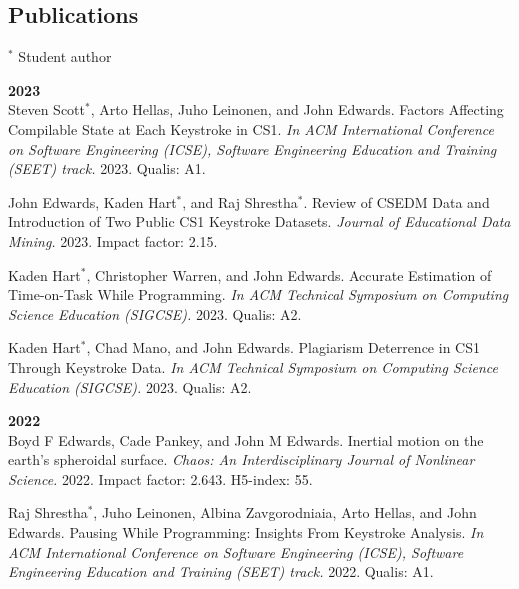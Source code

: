 \documentclass[margin,line]{res}
\newcommand{\pnum}[1]{}
\begin{document}
\begin{resume}
\section{\sc Publications}

\begin{footnotesize}$^*$ Student author\end{footnotesize}

\textbf{2023} \\
\pnum{47} Steven Scott$^*$, Arto Hellas, Juho Leinonen, and John Edwards. Factors Affecting Compilable State at Each Keystroke in CS1. \textit{In ACM International Conference on Software Engineering (ICSE), Software Engineering Education and Training (SEET) track.} 2023. Qualis: A1.

\pnum{46} John Edwards, Kaden Hart$^*$, and Raj Shrestha$^*$. Review of CSEDM Data and Introduction of Two Public CS1 Keystroke Datasets. \textit{Journal of Educational Data Mining.} 2023. Impact factor: 2.15.

\pnum{45} Kaden Hart$^*$, Christopher Warren, and John Edwards. Accurate Estimation of Time-on-Task While Programming. \textit{In ACM Technical Symposium on Computing Science Education (SIGCSE).} 2023. Qualis: A2.

\pnum{44} Kaden Hart$^*$, Chad Mano, and John Edwards. Plagiarism Deterrence in CS1 Through Keystroke Data. \textit{In ACM Technical Symposium on Computing Science Education (SIGCSE).} 2023. Qualis: A2.

\textbf{2022} \\
\pnum{43} Boyd F Edwards, Cade Pankey, and John M Edwards. Inertial motion on the earth’s spheroidal surface. \textit{Chaos: An Interdisciplinary Journal of Nonlinear Science.} 2022. Impact factor: 2.643. H5-index: 55.

\pnum{42} Raj Shrestha$^*$, Juho Leinonen, Albina Zavgorodniaia, Arto Hellas, and John Edwards. Pausing While Programming: Insights From Keystroke Analysis. \textit{In ACM International Conference on Software Engineering (ICSE), Software Engineering Education and Training (SEET) track.} 2022. Qualis: A1.


\end{resume}
\end{document}
